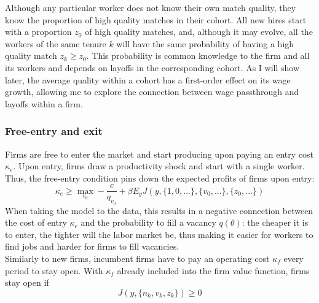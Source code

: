 Although any particular worker does not know their own match quality, they know the proportion of high quality matches in their cohort. All new hires start with a proportion $z_0$ of high quality matches, and, although it may evolve, all the workers of the same tenure $k$ will have the same probability of having a high quality match $z_k\geq z_0$. This probability is common knowledge to the firm and all its workers and depends on layoffs in the corresponding cohort. As I will show later, the average quality within a cohort has a first-order effect on its wage growth, allowing me to explore the connection between wage passthrough and layoffs within a firm. %

\subsubsection*{Free-entry and exit}
Firms are free to enter the market and start producing upon paying an entry cost $\kappa_e$. Upon entry, firms draw a productivity shock and start with a single worker. Thus, the free-entry condition pins down the expected profits of firms upon entry:
\begin{equation} \label{freeentry}
    \kappa_e\geq \max_{v_0} -\frac{c}{q_{v_0}}+\beta E_y J(y,\{1,0,...\},\{v_0,...\},\{z_0,...\})
\end{equation}
When taking the model to the data, this results in a negative connection between the cost of entry $\kappa_e$ and the probability to fill a vacancy $q(\theta)$: the cheaper it is to enter, the tighter will the labor market be, thus making it easier for workers to find jobs and harder for firms to fill vacancies.
\\
Similarly to new firms, incumbent firms have to pay an operating cost $\kappa_f$ every period to stay open. With $\kappa_f$ already included into the firm value function, firms stay open if 
\begin{equation} \label{freeexit}
    J(y,\{n_k,v_k,z_k\})\geq 0
\end{equation}

